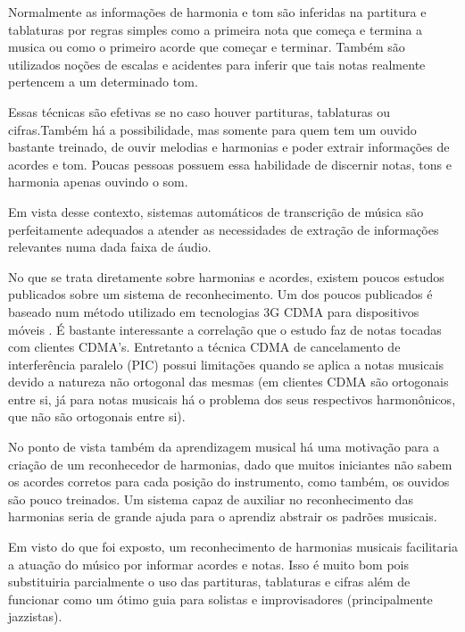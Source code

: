 Normalmente as informações de harmonia e tom são inferidas na partitura e tablaturas por regras simples como a primeira nota que começa e termina a musica ou como o primeiro acorde que começar e terminar. Também são utilizados noções de escalas e acidentes para inferir que tais notas realmente pertencem a um determinado tom.

Essas técnicas são efetivas se no caso houver partituras, tablaturas ou cifras.Também há a possibilidade, mas somente para quem tem um ouvido bastante treinado, de ouvir melodias e harmonias e poder extrair informações de acordes e tom. Poucas pessoas possuem essa habilidade de discernir notas, tons e harmonia apenas ouvindo o som.

Em vista desse contexto, sistemas automáticos de transcrição de música \cite{automaticmusic} são perfeitamente adequados a atender as necessidades de extração de informações relevantes numa dada faixa de áudio.

No que se trata diretamente sobre harmonias e acordes, existem poucos estudos publicados sobre um sistema de reconhecimento. Um dos poucos publicados é baseado num método utilizado em tecnologias 3G CDMA para dispositivos móveis \cite{picchords}. É bastante interessante a correlação que o estudo faz de notas tocadas com clientes CDMA's. Entretanto a técnica CDMA de cancelamento de interferência paralelo (PIC) possui limitações quando se aplica a notas musicais devido a natureza não ortogonal das mesmas (em clientes CDMA são ortogonais entre si, já para notas musicais há o problema dos seus respectivos harmonônicos, que não são ortogonais entre si).

No ponto de vista também da aprendizagem musical há uma motivação para a criação de um reconhecedor de harmonias, dado que muitos iniciantes não sabem os acordes corretos para cada posição do instrumento, como também, os ouvidos são pouco treinados. Um sistema capaz de auxiliar no reconhecimento das harmonias seria de grande ajuda para o aprendiz abstrair os padrões musicais.

Em visto do que foi exposto, um reconhecimento de harmonias musicais facilitaria a atuação do músico por informar acordes e notas. Isso é muito bom pois substituiria parcialmente o uso das partituras, tablaturas e cifras além de funcionar como um ótimo guia para solistas e improvisadores (principalmente jazzistas).

